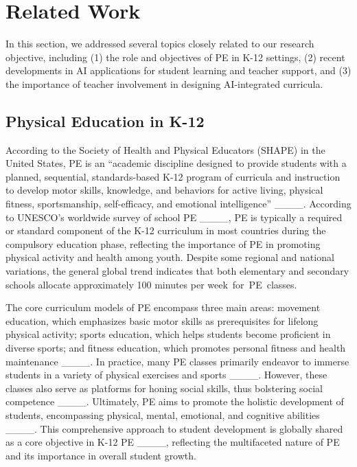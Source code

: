 \section{Related Work}
In this section, we addressed several topics closely related to our research objective, including (1) the role and objectives of PE in K-12 settings, (2) recent developments in AI applications for student learning and teacher support, and (3) the importance of teacher involvement in designing AI-integrated curricula.

\subsection{Physical Education in K-12} 
According to the Society of Health and Physical Educators (SHAPE) in the United States, PE is an ``academic discipline designed to provide students with a planned, sequential, standards-based K-12 program of curricula and instruction to develop motor skills, knowledge, and behaviors for active living, physical fitness, sportsmanship, self-efficacy, and emotional intelligence'' ____. According to UNESCO's worldwide survey of school PE ____, PE is typically a required or standard component of the K-12 curriculum in most countries during the compulsory education phase, reflecting the importance of PE in promoting physical activity and health among youth. Despite some regional and national variations, the general global trend indicates that both elementary and secondary schools allocate approximately 100 minutes per week~for~PE~classes.

The core curriculum models of PE encompass three main areas: movement education, which emphasizes basic motor skills as prerequisites for lifelong physical activity; sports education, which helps students become proficient in diverse sports; and fitness education, which promotes personal fitness and health maintenance ____. In practice, many PE classes primarily endeavor to immerse students in a variety of physical exercises and sports ____. However, these classes also serve as platforms for honing social skills, thus bolstering social competence ____.
Ultimately, PE aims to promote the holistic development of students, encompassing physical, mental, emotional, and cognitive abilities ____. This comprehensive approach to student development is globally shared as a core objective in K-12 PE ____, reflecting the multifaceted nature of PE and its importance in overall student growth.

